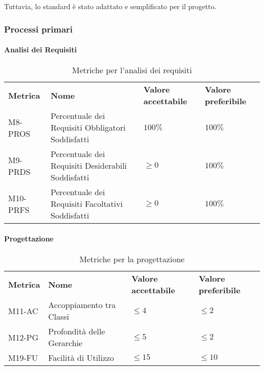 \noindent Tuttavia, lo standard è stato adattato e semplificato per il progetto.


\subsubsection{Processi primari} \label{processi primari}

\paragraph{Analisi dei Requisiti}

\begin{table}[h]
    \begin{adjustbox}{width=\textwidth}
    \centering
    \renewcommand{\arraystretch}{1.5}
    \begin{tabular}{>{\centering\arraybackslash} m{2cm} >{\centering\arraybackslash} m{6cm} >{\centering\arraybackslash} m{3cm} >{\centering\arraybackslash} m{3cm}}
    \rowcolor[HTML]{bfbfbf} 
    \textbf{Metrica} & \textbf{Nome} & \textbf{Valore accettabile} & \textbf{Valore preferibile} \\
    M8-PROS & Percentuale dei Requisiti Obbligatori Soddisfatti &  $100\%$ & $100\%$\\
    M9-PRDS & Percentuale dei Requisiti Desiderabili Soddisfatti & $\ge 0$ & $100\%$\\
    M10-PRFS & Percentuale dei Requisiti Facoltativi Soddisfatti &   $\ge 0$ & $100\%$\\
    \end{tabular}
    \end{adjustbox}
    \caption{Metriche per l'analisi dei requisiti}
\end{table}

\clearpage


\paragraph{Progettazione}

\begin{table}[h]
    \begin{adjustbox}{width=\textwidth}
    \centering
    \renewcommand{\arraystretch}{1.5}
    \begin{tabular}{>{\centering\arraybackslash} m{2cm} >{\centering\arraybackslash} m{6cm} >{\centering\arraybackslash} m{3cm} >{\centering\arraybackslash} m{3cm}}
    \rowcolor[HTML]{bfbfbf} 
    \textbf{Metrica} & \textbf{Nome} & \textbf{Valore accettabile} & \textbf{Valore preferibile} \\
    M11-AC & Accoppiamento tra Classi & $\le 4$ & $\le 2$ \\
    M12-PG & Profondità delle Gerarchie & $\le 5$ & $\le 2$\\
    M19-FU & Facilità di Utilizzo & $\le 15$ & $\le 10$ \\ 
    \end{tabular}
    \end{adjustbox}
    \caption{Metriche per la progettazione}
\end{table}


